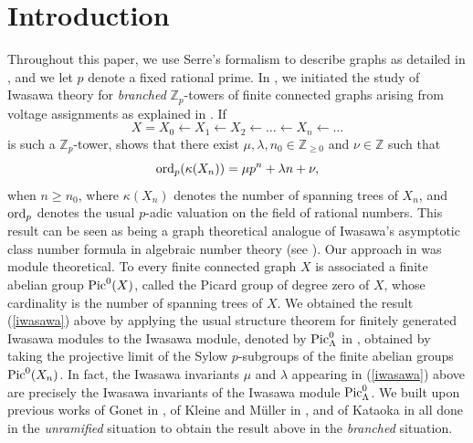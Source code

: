 \documentclass[11pt]{amsart}
\numberwithin{equation}{section}
\theoremstyle{remark}
\theoremstyle{definition}
\begin{document}
\section{Introduction} \label{Introduction}
Throughout this paper, we use Serre's formalism to describe graphs as detailed in \cite{Serre:1977}, and we let $p$ denote a fixed rational prime.  In \cite{Gambheera/Vallieres:2024}, we initiated the study of Iwasawa theory for \emph{branched} $\mathbb{Z}_{p}$-towers of finite connected graphs arising from voltage assignments as explained in \cite[\S 4.3]{Gambheera/Vallieres:2024}.  If 
\begin{equation*}
X = X_{0} \leftarrow X_{1} \leftarrow X_{2} \leftarrow \ldots \leftarrow X_{n} \leftarrow \ldots 
\end{equation*}
is such a $\mathbb{Z}_{p}$-tower, \cite[Theorem 5.6]{Gambheera/Vallieres:2024} shows that there exist $\mu,\lambda,n_{0} \in \mathbb{Z}_{\ge 0}$ and $\nu \in \mathbb{Z}$ such that
\begin{equation} \label{iwasawa}
{\rm ord}_{p}(\kappa(X_{n})) = \mu p^{n} + \lambda n + \nu, 
\end{equation}
when $n \ge n_{0}$, where $\kappa(X_{n})$ denotes the number of spanning trees of $X_{n}$, and ${\rm ord}_{p}$ denotes the usual $p$-adic valuation on the field of rational numbers.  This result can be seen as being a graph theoretical analogue of Iwasawa's asymptotic class number formula in algebraic number theory (see \cite{Iwasawa:1959, Iwasawa:1973}).  Our approach in \cite{Gambheera/Vallieres:2024} was module theoretical.  To every finite connected graph $X$ is associated a finite abelian group ${\rm Pic}^{0}(X)$, called the Picard group of degree zero of $X$, whose cardinality is the number of spanning trees of $X$.  We obtained the result (\ref{iwasawa}) above by applying the usual structure theorem for finitely generated Iwasawa modules to the Iwasawa module, denoted by ${\rm Pic}_{\Lambda}^{0}$ in \cite[\S 4.3]{Gambheera/Vallieres:2024}, obtained by taking the projective limit of the Sylow $p$-subgroups of the finite abelian groups ${\rm Pic}^{0}(X_{n})$.  In fact, the Iwasawa invariants $\mu$ and $\lambda$ appearing in (\ref{iwasawa}) above are precisely the Iwasawa invariants of the Iwasawa module ${\rm Pic}_{\Lambda}^{0}$.  We built upon previous works of Gonet in \cite{Gonet:2021a, Gonet:2022}, of Kleine and M\"{u}ller in \cite{Kleine/Muller:2023}, and of Kataoka in \cite{Kataoka:2024} all done in the \emph{unramified} situation to obtain the result above in the \emph{branched} situation.
\end{document}
